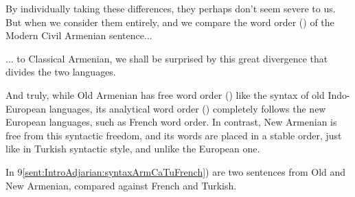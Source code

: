 By individually taking these differences, they perhaps don't seem severe to us. But when we consider them entirely, and we compare the word order () of the Modern Civil Armenian sentence... 



\begin{adjarianpage}\label{page:24}\end{adjarianpage}%

... to Classical Armenian, we shall be surprised by this great divergence that divides the two languages. 

And truly, while Old Armenian has free word order () like the syntax of old Indo-European languages, its analytical word order () completely follows the new European languages, such as French word order. In contrast, New Armenian is free from this syntactic freedom, and its words are placed in a stable order, just like in Turkish syntactic style, and unlike the European one. 

In 9\ref{sent:IntroAdjarian:syntaxArmCaTuFrench}) are two sentences from Old and New Armenian, compared against French and Turkish.%

